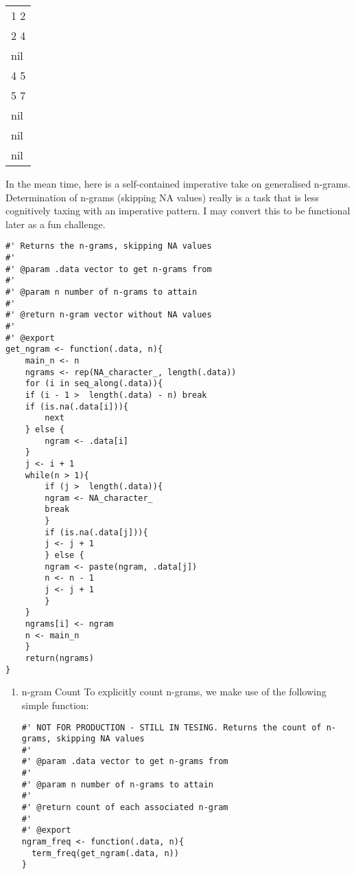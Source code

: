 \documentclass[a4paper, 11pt]{article}
\begin{document}
\begin{center}
\begin{tabular}{l}
1 2\\
2 4\\
nil\\
4 5\\
5 7\\
nil\\
nil\\
nil\\
\end{tabular}
\end{center}

In the mean time, here is a self-contained imperative take on
generalised n-grams. Determination of n-grams (skipping NA values)
really is a task that is less cognitively taxing with an imperative
pattern. I may convert this to be functional later as a fun challenge.

\begin{verbatim}
#' Returns the n-grams, skipping NA values
#'
#' @param .data vector to get n-grams from
#'
#' @param n number of n-grams to attain
#'
#' @return n-gram vector without NA values
#'
#' @export
get_ngram <- function(.data, n){
    main_n <- n
    ngrams <- rep(NA_character_, length(.data))
    for (i in seq_along(.data)){
	if (i - 1 >  length(.data) - n) break
	if (is.na(.data[i])){
	    next
	} else {
	    ngram <- .data[i]
	}
	j <- i + 1
	while(n > 1){
	    if (j >  length(.data)){
		ngram <- NA_character_
		break
	    }
	    if (is.na(.data[j])){
		j <- j + 1
	    } else {
		ngram <- paste(ngram, .data[j])
		n <- n - 1
		j <- j + 1
	    }
	}
	ngrams[i] <- ngram
	n <- main_n
    }
    return(ngrams)
}
\end{verbatim}

\begin{enumerate}
\item n-gram Count
\label{sec:org9a85feb}
To explicitly count n-grams, we make use of the following simple function:
\begin{verbatim}
#' NOT FOR PRODUCTION - STILL IN TESING. Returns the count of n-grams, skipping NA values
#'
#' @param .data vector to get n-grams from
#'
#' @param n number of n-grams to attain
#'
#' @return count of each associated n-gram
#'
#' @export
ngram_freq <- function(.data, n){
  term_freq(get_ngram(.data, n))
}
\end{verbatim}
\end{enumerate}
\end{document}
